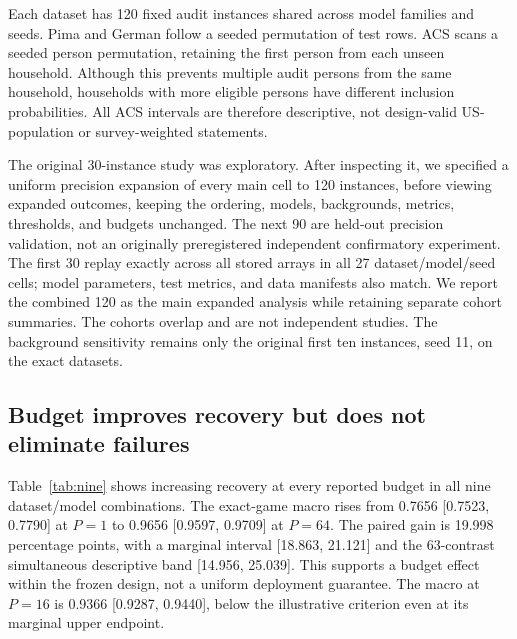 \documentclass{article}
\DeclareRobustCommand{\artifact}[1]{\path{#1}}
\begin{document}
Each dataset has 120 fixed audit instances shared across model families and seeds. Pima and German follow a seeded permutation of test rows. ACS scans a seeded person permutation, retaining the first person from each unseen household. Although this prevents multiple audit persons from the same household, households with more eligible persons have different inclusion probabilities. All ACS intervals are therefore descriptive, not design-valid US-population or survey-weighted statements.

The original 30-instance study was exploratory. After inspecting it, we specified a uniform precision expansion of every main cell to 120 instances, before viewing expanded outcomes, keeping the ordering, models, backgrounds, metrics, thresholds, and budgets unchanged. The next 90 are held-out precision validation, not an originally preregistered independent confirmatory experiment. The first 30 replay exactly across all stored arrays in all 27 dataset/model/seed cells; model parameters, test metrics, and data manifests also match. We report the combined 120 as the main expanded analysis while retaining separate cohort summaries. The cohorts overlap and are not independent studies. The background sensitivity remains only the original first ten instances, seed 11, on the exact datasets.

\subsection{Budget improves recovery but does not eliminate failures}
\begin{table}[t]
\caption{Single-run antithetic top-three set recovery $\uparrow$ for the combined 120-instance audit. Entries are means and marginal descriptive 95\% paired instance-cluster intervals, with runs and fixed seeds averaged within instance. \textbf{German rows measure agreement with an approximate reference, not true accuracy.} Source: \artifact{analysis120/paper_antithetic_9cells.tex} and matching CSV.}
\label{tab:nine}
\centering
\resizebox{\textwidth}{!}{}
\end{table}

Table~\ref{tab:nine} shows increasing recovery at every reported budget in all nine dataset/model combinations. The exact-game macro rises from 0.7656 [0.7523, 0.7790] at $P=1$ to 0.9656 [0.9597, 0.9709] at $P=64$. The paired gain is 19.998 percentage points, with a marginal interval [18.863, 21.121] and the 63-contrast simultaneous descriptive band [14.956, 25.039]. This supports a budget effect within the frozen design, not a uniform deployment guarantee. The macro at $P=16$ is 0.9366 [0.9287, 0.9440], below the illustrative criterion even at its marginal upper endpoint.
\end{document}
